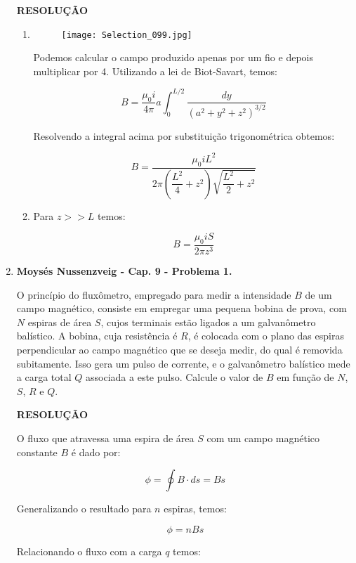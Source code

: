 \documentclass[11pt,a4paper]{article}
\begin{document}
\begin{enumerate}
\textbf{RESOLUÇÃO}

\begin{enumerate}

\item 


\begin{figure}[h]	
\centering %
\texttt{[image: Selection\_099.jpg]} 
\end{figure}

Podemos calcular o campo produzido apenas por um fio e depois multiplicar por 4. Utilizando a lei de Biot-Savart, temos:

$$B = \displaystyle\dfrac{\mu_0 i}{4 \pi} a \displaystyle\int_0^{L/2} \displaystyle\dfrac{dy}{(a^2 + y^2 + z^2)^{3/2}}$$

Resolvendo a integral acima por substituição trigonométrica obtemos:

$$B = \displaystyle\dfrac{\mu_0 i L^2}{2 \pi \left(\displaystyle\dfrac{L^2}{4} + z^2\right)\sqrt{\displaystyle\dfrac{L^2}{2} + z^2}}$$

\item

Para $z >> L$ temos:

$$B = \displaystyle\dfrac{\mu_0 i S}{2 \pi z^3}$$

\end{enumerate}


\item \textbf{Moysés Nussenzveig - Cap. 9 - Problema 1.}

O princípio do fluxômetro, empregado para medir a intensidade $B$ de um campo magnético, consiste em empregar uma pequena bobina de prova, com $N$ espiras de área $S$, cujos terminais estão ligados a um galvanômetro balístico. A bobina, cuja resistência é $R$, é colocada com o plano das espiras perpendicular ao campo magnético que se deseja medir, do qual é removida subitamente. Isso gera um pulso de corrente, e o galvanômetro balístico mede a carga total $Q$ associada a este pulso. Calcule o valor de $B$ em função de $N$, $S$, $R$ e $Q$.

\textbf{RESOLUÇÃO}

O fluxo que atravessa uma espira de área $S$ com um campo magnético constante $B$ é dado por:

$$\phi = \displaystyle\oint B \cdot ds = B s$$

Generalizando o resultado para $n$ espiras, temos:

$$\phi = n B s$$

Relacionando o fluxo com a carga $q$ temos:


\end{enumerate}
\end{document}
